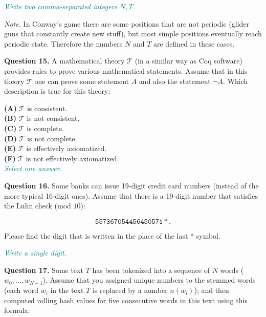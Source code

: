 \documentclass[jou]{apa6}
\begin{document}
\textcolor{teal}{\em Write two comma-separated integers $N,T$.}

{\em Note.} In Conway's game there are some positions 
that are not periodic (glider guns that 
constantly create new stuff), but most simple positions eventually reach periodic state. 
Therefore the numbers $N$ and $T$ are defined in these cases.




\vspace{10pt} 
{\bf Question 15.} A mathematical theory $\mathcal{T}$ (in a similar way as Coq software) 
provides rules to prove various mathematical statements. 
Assume that in this theory $\mathcal{T}$ one can prove some statement $A$ and also the
statement $\neg A$. Which description is true for this theory:

{\bf (A)} $\mathcal{T}$ is consistent.\\
{\bf (B)} $\mathcal{T}$ is not consistent.\\
{\bf (C)} $\mathcal{T}$ is complete.\\
{\bf (D)} $\mathcal{T}$ is not complete.\\
{\bf (E)} $\mathcal{T}$ is effectively axiomatized.\\
{\bf (F)} $\mathcal{T}$ is not effectively axiomatized.\\
\textcolor{teal}{\em Select one answer.}


\vspace{10pt} 
{\bf Question 16.} Some banks can issue
19-digit credit card numbers (instead of the more typical 16-digit ones). 
Assume that there is a 19-digit number that satisfies the Luhn check (mod $10$):

$$\mathtt{557367054456450571\ast}.$$

Please find the digit that is written in the place of the last $\ast$ symbol.

\textcolor{teal}{\em Write a single digit.}


\vspace{10pt} 
{\bf Question 17.} 
Some text $T$ has been tokenized into a sequence of $N$ words ($w_0,\ldots,w_{N-1}$). 
Assume that you assigned
unique numbers to the stemmed words (each word $w_i$ in the text $T$ is replaced by 
a number $n(w_i)$); and then computed rolling hash values for 
five consecutive words in this text using this formula:\\

\end{document}
